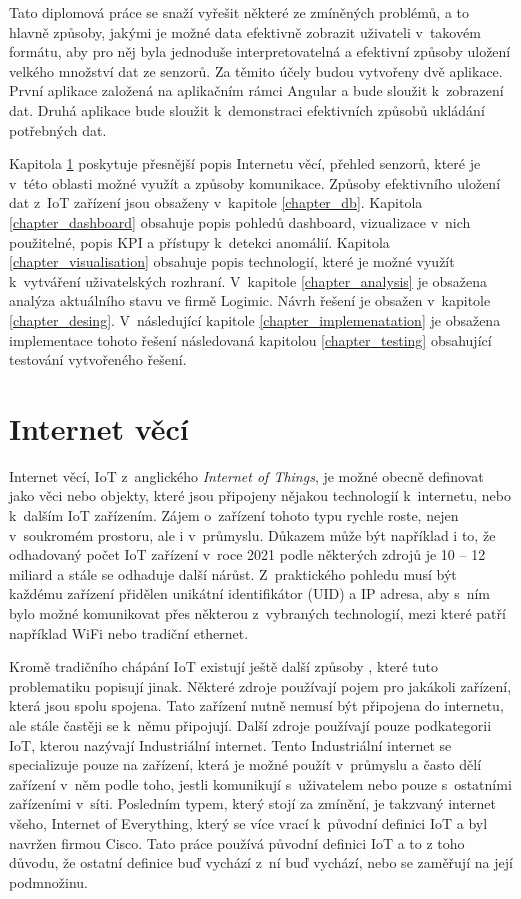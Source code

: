 Tato diplomová práce se snaží vyřešit některé ze zmíněných problémů, a to hlavně způsoby, jakými je možné data efektivně zobrazit uživateli v~takovém formátu, aby pro něj byla jednoduše interpretovatelná a efektivní způsoby uložení velkého množství dat ze senzorů. Za těmito účely budou vytvořeny dvě aplikace. První aplikace založená na aplikačním rámci Angular a bude sloužit k~zobrazení dat. Druhá aplikace bude sloužit k~demonstraci efektivních způsobů ukládání potřebných dat.

Kapitola \ref{chapter_iot} poskytuje přesnější popis Internetu věcí, přehled senzorů, které je v~této oblasti možné využít a způsoby komunikace. Způsoby efektivního uložení dat z~IoT zařízení jsou obsaženy v~kapitole \ref{chapter_db}. Kapitola \ref{chapter_dashboard} obsahuje popis pohledů dashboard, vizualizace v~nich použitelné, popis KPI a přístupy k~detekci anomálií. Kapitola \ref{chapter_visualisation} obsahuje popis technologií, které je možné využít k~vytváření uživatelských rozhraní. V~kapitole \ref{chapter_analysis} je obsažena analýza aktuálního stavu ve firmě Logimic. Návrh řešení je obsažen v~kapitole \ref{chapter_desing}. V~následující kapitole \ref{chapter_implemenatation} je obsažena implementace tohoto řešení následovaná kapitolou \ref{chapter_testing} obsahující testování vytvořeného řešení.

\chapter{Internet věcí}
\label{chapter_iot}
Internet věcí, IoT z~anglického \textit{Internet of Things}, je možné obecně definovat jako věci nebo objekty, které jsou připojeny nějakou technologií k~internetu, nebo k~dalším IoT zařízením. Zájem o~zařízení tohoto typu rychle roste, nejen v~soukromém prostoru, ale i v~průmyslu. Důkazem může být například i to, že odhadovaný počet IoT zařízení v~roce 2021 podle některých zdrojů je 10 -- 12 miliard \cite{iotAnalytics_2021, holst_2021} a stále se odhaduje další nárůst. Z~praktického pohledu musí být každému zařízení přidělen unikátní identifikátor (UID) a IP adresa, aby s~ním bylo možné komunikovat přes některou z~vybraných technologií, mezi které patří například WiFi nebo tradiční ethernet.

Kromě tradičního chápání IoT existují ještě další způsoby \cite{greengard2015internet}, které tuto problematiku popisují jinak. Některé zdroje používají pojem  pro jakákoli zařízení, která jsou spolu spojena. Tato zařízení nutně nemusí být připojena do internetu, ale stále častěji se k~němu připojují. Další zdroje používají pouze podkategorii IoT, kterou nazývají Industriální internet. Tento Industriální internet se specializuje pouze na zařízení, která je možné použít v~průmyslu a často dělí zařízení v~něm podle toho, jestli komunikují s~uživatelem nebo pouze s~ostatními zařízeními v~síti. Posledním typem, který stojí za zmínění, je takzvaný internet všeho, Internet of Everything, který se více vrací k~původní definici IoT a byl navržen firmou Cisco. Tato práce používá původní definici IoT a to z toho důvodu, že ostatní definice buď vychází z~ní buď vychází, nebo se zaměřují na její podmnožinu.

